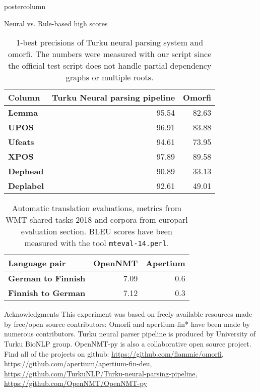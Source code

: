 \documentclass[final,hyperref={pdfpagelabels}]{beamer}
\begin{document}
\begin{frame}
\begin{columns}
\begin{column}{.49\textwidth}
\begin{beamercolorbox}[center,wd=\textwidth]{postercolumn}
\begin{minipage}[T]{.95\textwidth}
{\begin{block}{Neural vs. Rule-based high scores}
\begin{table}
\begin{centering}
\begin{tabular}{lrr}
        \toprule
    Column & \bf Turku Neural parsing pipeline & \bf Omorfi \\
        \midrule
        \bf Lemma & 95.54 & 82.63 \\
        \bf UPOS & 96.91 & 83.88 \\
        \bf Ufeats & 94.61 & 73.95\\
        \bf XPOS & 97.89 & 89.58 \\
        \bf Dephead & 90.89 & 33.13 \\
        \bf Deplabel & 92.61 & 49.01 \\
        \bottomrule
    \end{tabular}
    \caption{1-best precisions of Turku neural parsing system and
    omorfi. The numbers were measured with our script since the official
    test script does not handle partial dependency graphs or multiple roots.
\label{table:eval-ud}}
\end{centering}
\end{table}
\begin{table}
\begin{centering}
    \begin{tabular}{lrr}
        \toprule
    Language pair & \bf OpenNMT & \bf Apertium \\
        \midrule
        \bf German to Finnish & 7.09 & 0.6 \\
        \bf Finnish to German & 7.12 & 0.3  \\
        \bottomrule
    \end{tabular}
    \caption{Automatic translation evaluations, metrics from WMT shared
    tasks 2018 and corpora from europarl evaluation section. BLEU scores have
    been measured with the tool \texttt{mteval-14.perl}.
\label{table:eval-wmt}}
\end{centering}
\end{table}

        \end{block}

        \begin{block}{Acknowledgments}
            This experiment was based on freely available resources made by
            free/open source contributors:
            Omorfi and apertium-fin* have been made by numerous contributors.
            Turku neural parser pipeline is produced by University of Turku
            BioNLP group. OpenNMT-py is also a collaborative open source
            project. Find all of the projects on github:
            \url{https://github.com/flammie/omorfi},
            \url{https://github.com/apertium/apertium-fin-deu},
            \url{https://github.com/TurkuNLP/Turku-neural-parsing-pipeline},
            \url{https://github.com/OpenNMT/OpenNMT-py}
        \end{block}

}
\end{minipage}
\end{beamercolorbox}
\end{column}
\end{columns}
\end{frame}
\end{document}
